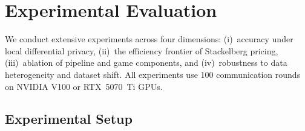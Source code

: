 %
%

\section{Experimental Evaluation}\label{sec:results}

We conduct extensive experiments across four dimensions:
(i)~accuracy under local differential privacy,
(ii)~the efficiency frontier of Stackelberg pricing,
(iii)~ablation of pipeline and game components, and
(iv)~robustness to data heterogeneity and dataset shift.
All experiments use 100 communication rounds on NVIDIA V100 or RTX~5070~Ti GPUs.

\subsection{Experimental Setup}\label{sec:setup}

